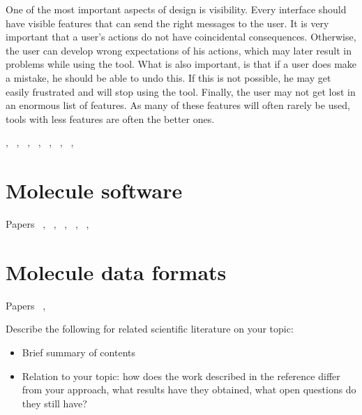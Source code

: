 One of the most important aspects of design is visibility. Every interface should have visible features that can send the right messages to the user. It is very important that a user's actions do not have coincidental consequences. Otherwise, the user can develop wrong expectations of his actions, which may later result in problems while using the tool. What is also important, is that if a user does make a mistake, he should be able to undo this. If this is not possible, he may get easily frustrated and will stop using the tool. Finally, the user may not get lost in an enormous list of features. As many of these features will often rarely be used, tools with less features are often the better ones.





, ~\cite{norman1990interfaces}, ~\cite{norman2002emotion}, ~\cite{norman2005human}, ~\cite{norman2010gestural}, ~\cite{thimbleby2007press}, ~\cite{blair2008user}, ~\cite{badre2002shaping}


\section{Molecule software}

Papers ~\cite{ertl2010molecular}, ~\cite{hanson2013jsmol}, ~\cite{bienfait2013jsme}, ~\cite{ekins2013tb}, ~\cite{fjeld2007tangible}, ~\cite{ertl2012molecule}


\section{Molecule data formats}

Papers ~\cite{daylight1992daylight}, ~\cite{heller2013inchi}





Describe the following for related scientific literature on your topic:
\begin{itemize}
\item Brief summary of contents
\item Relation to your topic: how does the work described in the reference differ from your approach, what results have they obtained, what open questions do they still have?
\end{itemize}
